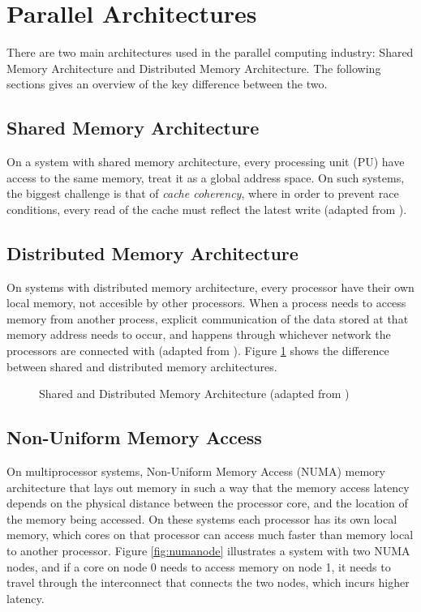 \section{Parallel Architectures}
There are two main architectures used in the parallel computing industry: Shared Memory Architecture and Distributed Memory Architecture. The following sections gives an overview of the key difference between the two.

\subsection{Shared Memory Architecture}
On a system with shared memory architecture, every processing unit (PU) have access to the same memory, treat it as a global address space. On such systems, the biggest challenge is that of \textit{cache coherency}, where in order to prevent race conditions, every read of the cache must reflect the latest write (adapted from \cite{manchanda2010non}). 

\subsection{Distributed Memory Architecture}
On systems with distributed memory architecture, every processor have their own local memory, not accesible by other processors. When a process needs to access memory from another process, explicit communication of the data stored at that memory address needs to occur, and happens through whichever network the processors are connected with (adapted from \cite{manchanda2010non}). Figure \ref{fig:sharedmemory} shows the difference between shared and distributed memory architectures.
\medskip


\begin{figure}[ht]
    \centering
    \caption{Shared and Distributed Memory Architecture (adapted from \cite{llnlparallel})}
    \label{fig:sharedmemory}
\end{figure}

\subsection{Non-Uniform Memory Access}
On multiprocessor systems, Non-Uniform Memory Access (NUMA) memory architecture that lays out memory in such a way that the memory access latency depends on the physical distance between the processor core, and the location of the memory being accessed. On these systems each processor has its own local memory, which cores on that processor can access much faster than memory local to another processor. Figure \ref{fig:numanode} illustrates a system with two NUMA nodes, and if a core on node 0 needs to access memory on node 1, it needs to travel through the interconnect that connects the two nodes, which incurs higher latency.
\medskip

